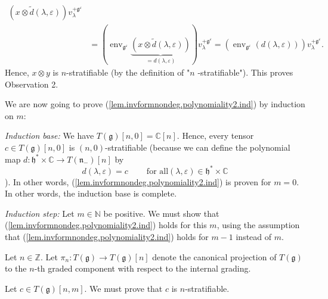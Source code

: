 \documentclass
[numbers=enddot,12pt,final,onecolumn,german,notitlepage]{scrartcl}%
\theoremstyle{definition}
\begin{document}
{\begin{align*}
{{{}}\left(  x\otimes\widetilde{d}\left(  \lambda,\varepsilon\right)  \right)
}v_{\lambda}^{+\mathfrak{g}^{\varepsilon}}\\
&  =\left(  \operatorname*{env}\nolimits_{\mathfrak{g}^{\varepsilon}%
}\underbrace{\left(  x\otimes\widetilde{d}\left(  \lambda,\varepsilon\right)
\right)  }_{=d\left(  \lambda,\varepsilon\right)  }\right)  v_{\lambda
}^{+\mathfrak{g}^{\varepsilon}}=\left(  \operatorname*{env}%
\nolimits_{\mathfrak{g}^{\varepsilon}}\left(  d\left(  \lambda,\varepsilon
\right)  \right)  \right)  v_{\lambda}^{+\mathfrak{g}^{\varepsilon}}.
\end{align*}
Hence, $x\otimes y$ is $n$-stratifiable (by the definition of "$n$%
-stratifiable"). This proves Observation 2.}

We are now going to prove (\ref{lem.invformnondeg.polynomiality2.ind}) by
induction on $m$:

\textit{Induction base:} We have $T\left(  \mathfrak{g}\right)  \left[
n,0\right]  =\mathbb{C}\left[  n\right]  $. Hence, every tensor $c\in T\left(
\mathfrak{g}\right)  \left[  n,0\right]  $ is $\left(  n,0\right)
$-stratifiable (because we can define the polynomial map $d:\mathfrak{h}%
^{\ast}\times\mathbb{C}\rightarrow T\left(  \mathfrak{n}_{-}\right)  \left[
n\right]  $ by%
\[
d\left(  \lambda,\varepsilon\right)  =c\ \ \ \ \ \ \ \ \ \ \text{for all
}\left(  \lambda,\varepsilon\right)  \in\mathfrak{h}^{\ast}\times\mathbb{C}%
\]
). In other words, (\ref{lem.invformnondeg.polynomiality2.ind}) is proven for
$m=0$. In other words, the induction base is complete.

\textit{Induction step:} Let $m\in\mathbb{N}$ be positive. We must show that
(\ref{lem.invformnondeg.polynomiality2.ind}) holds for this $m$, using the
assumption that (\ref{lem.invformnondeg.polynomiality2.ind}) holds for $m-1$
instead of $m$.

Let $n\in\mathbb{Z}$. Let $\pi_{n}:T\left(  \mathfrak{g}\right)  \rightarrow
T\left(  \mathfrak{g}\right)  \left[  n\right]  $ denote the canonical
projection of $T\left(  \mathfrak{g}\right)  $ to the $n$-th graded component
with respect to the internal grading.

Let $c\in T\left(  \mathfrak{g}\right)  \left[  n,m\right]  $. We must prove
that $c$ is $n$-stratifiable.
\end{document}
